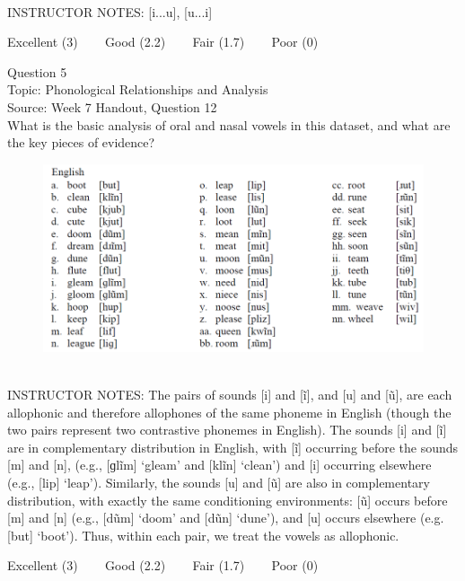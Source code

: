 \documentclass[12pt]{article}
\begin{document}
~\\
INSTRUCTOR NOTES: [i...u], [u...i]


\vfill
Excellent (3) ~~~ Good (2.2) ~~~ Fair (1.7) ~~~ Poor (0)
\newpage

{\large Question 5}\\

Topic: Phonological Relationships and Analysis\\
Source: Week 7 Handout, Question 12\\

What is the basic analysis of oral and nasal vowels in this dataset, and what are the key pieces of evidence?\\

\begin{figure}[H]
\includegraphics{../images/english12.png}
\end{figure}

~\\
INSTRUCTOR NOTES: The pairs of sounds [i] and [ĩ], and [u] and [ũ], are each allophonic and therefore allophones of the same phoneme in English (though the two pairs represent two contrastive phonemes in English). The sounds [i] and [ĩ] are in complementary distribution in English, with [ĩ] occurring before the sounds [m] and [n], (e.g., [ɡlĩm] ‘gleam’ and [klĩn] ‘clean’) and [i] occurring elsewhere (e.g., [lip] ‘leap’). Similarly, the sounds [u] and [ũ] are also in complementary distribution, with exactly the same conditioning environments: [ũ] occurs before [m] and [n] (e.g., [dũm] ‘doom’ and [dũn] ‘dune’), and [u] occurs elsewhere (e.g. [but] ‘boot’). Thus, within each pair, we treat the vowels as allophonic. 


\vfill
Excellent (3) ~~~ Good (2.2) ~~~ Fair (1.7) ~~~ Poor (0)
\newpage

\begin{center}
\textbf{{\color{red}{\HUGE END OF EXAM}}}\\

\end{center}
\newpage
\end{document}
